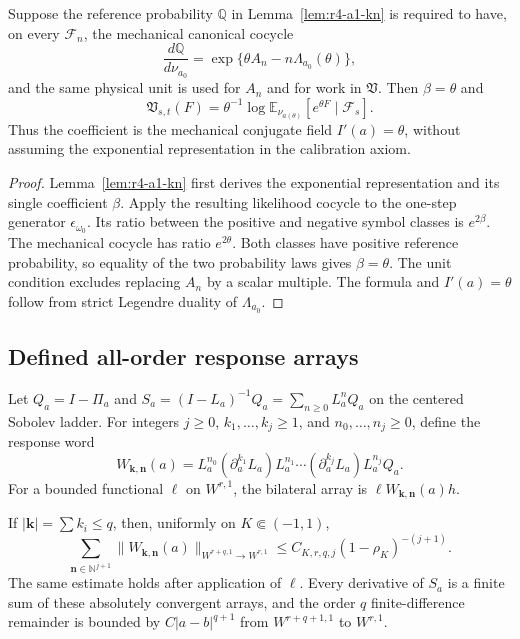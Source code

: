 \begin{theorem}
\label{thm:r3-a1-calibration}
Suppose the reference probability \(\mathbb Q\) in
Lemma~\ref{lem:r4-a1-kn} is required to have, on every \(\mathcal F_n\), the
mechanical canonical cocycle
\[
 \frac{d\mathbb Q}{d\nu_{a_0}}
 =\exp\{\theta A_n-n\Lambda_{a_0}(\theta)\},
\]
and the same physical unit is used for \(A_n\) and for work in
\(\mathfrak V\).  Then \(\beta=\theta\) and
\[
 \mathfrak V_{s,t}(F)
 =\theta^{-1}
 \log\mathbb E_{\nu_{a(\theta)}}
 [e^{\theta F}\mid\mathcal F_s].
\]
Thus the coefficient is the mechanical conjugate field
\(I'(a)=\theta\), without assuming the exponential representation in the
calibration axiom.
\end{theorem}

\begin{proof}
Lemma~\ref{lem:r4-a1-kn} first derives the exponential representation and its
single coefficient \(\beta\).  Apply the resulting likelihood cocycle to the
one-step generator \(\epsilon_{\omega_0}\).  Its ratio between the positive
and negative symbol classes is \(e^{2\beta}\).  The mechanical cocycle has
ratio \(e^{2\theta}\).  Both classes have positive reference probability, so
equality of the two probability laws gives \(\beta=\theta\).  The unit
condition excludes replacing \(A_n\) by a scalar multiple.  The formula and
\(I'(a)=\theta\) follow from strict Legendre duality of
\(\Lambda_{a_0}\).
\end{proof}

\subsection{Defined all-order response arrays}

Let \(Q_a=I-\Pi_a\) and
\(S_a=(I-L_a)^{-1}Q_a=\sum_{n\ge0}L_a^nQ_a\) on the centered Sobolev ladder.
For integers \(j\ge0\), \(k_1,\ldots,k_j\ge1\), and
\(n_0,\ldots,n_j\ge0\), define the response word
\[
 W_{\boldsymbol k,\boldsymbol n}(a)
 =L_a^{n_0}(\partial_a^{k_1}L_a)L_a^{n_1}\cdots
  (\partial_a^{k_j}L_a)L_a^{n_j}Q_a.
\]
For a bounded functional \(\ell\) on \(W^{r,1}\), the bilateral array is
\(\ell W_{\boldsymbol k,\boldsymbol n}(a)h\).

\begin{proposition}
\label{prop:r3-a1-array}
If \(|\boldsymbol k|=\sum k_i\le q\), then, uniformly on
\(K\Subset(-1,1)\),
\[
 \sum_{\boldsymbol n\in\mathbb N^{j+1}}
 \|W_{\boldsymbol k,\boldsymbol n}(a)\|_{W^{r+q,1}\to W^{r,1}}
 \le C_{K,r,q,j}(1-\rho_K)^{-(j+1)}.
\]
The same estimate holds after application of \(\ell\).  Every derivative of
\(S_a\) is a finite sum of these absolutely convergent arrays, and the order
\(q\) finite-difference remainder is bounded by
\(C|a-b|^{q+1}\) from \(W^{r+q+1,1}\) to \(W^{r,1}\).
\end{proposition}

